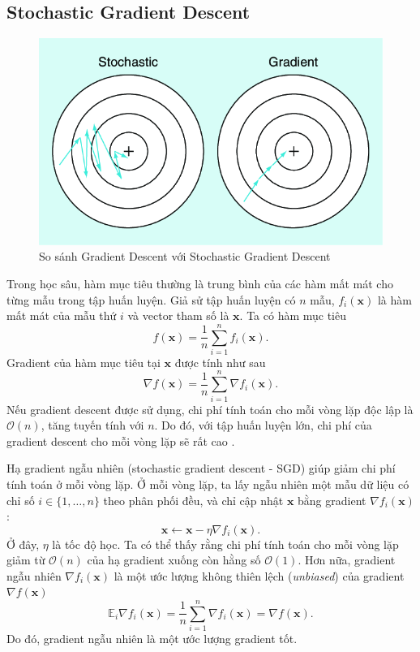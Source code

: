 \documentclass[11pt,oneside,a4paper]{report}
\theoremstyle{definition}
\begin{document}
\subsection{Stochastic Gradient Descent}
\begin{figure}[!h]
	\centering
	\includegraphics[scale=0.5]{images/h3}
	\caption{So sánh Gradient Descent với Stochastic Gradient Descent}
	\label{gdd}
\end{figure}

Trong học sâu, hàm mục tiêu thường là trung bình của các hàm mất mát cho từng mẫu trong tập huấn luyện. Giả sử tập huấn luyện có $n$  mẫu, $f_i(\mathbf{x})$ là hàm mất mát của mẫu thứ $i$  và vector tham số là $\mathbf{x}$.  Ta có hàm mục tiêu
$$f(\mathbf{x}) = \frac{1}{n} \sum_{i = 1}^n f_i(\mathbf{x}).$$
Gradient của hàm mục tiêu tại $\mathbf{x}$ được tính như sau
$$\nabla f(\mathbf{x}) = \frac{1}{n} \sum_{i = 1}^n \nabla f_i(\mathbf{x}).$$
Nếu gradient descent được sử dụng, chi phí tính toán cho mỗi vòng lặp độc lập là $\mathcal{O}(n)$, tăng tuyến tính với $n$. Do đó, với tập huấn luyện lớn, chi phí của gradient descent cho mỗi vòng lặp sẽ rất cao \cite{3}.

Hạ gradient ngẫu nhiên (stochastic gradient descent - SGD) giúp giảm chi phí tính toán ở mỗi vòng lặp. Ở mỗi vòng lặp, ta lấy ngẫu nhiên một mẫu dữ liệu có chỉ số $i\in\{1,\ldots, n\}$  theo phân phối đều, và chỉ cập nhật $\mathbf{x}$   bằng gradient $\nabla f_i(\mathbf{x})$:
$$\mathbf{x} \leftarrow \mathbf{x} - \eta \nabla f_i(\mathbf{x}).$$
Ở đây,  $\eta$ là tốc độ học.  Ta có thể thấy rằng chi phí tính toán cho mỗi vòng lặp giảm từ $\mathcal{O}(n)$  của hạ gradient xuống còn hằng số $\mathcal{O}(1)$. Hơn nữa, gradient ngẫu nhiên  $\nabla f_i(\mathbf{x})$  là một ước lượng không thiên lệch (\textit{unbiased}) của gradient $\nabla f(\mathbf{x})$
$$\mathbb{E}_i \nabla f_i(\mathbf{x}) = \frac{1}{n} \sum_{i = 1}^n \nabla f_i(\mathbf{x}) = \nabla f(\mathbf{x}).$$
Do đó, gradient ngẫu nhiên là một ước lượng gradient tốt.
\end{document}

